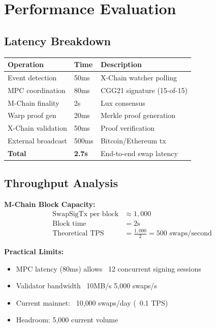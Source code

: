 \documentclass[11pt]{article}
\begin{document}
\section{Performance Evaluation}

\subsection{Latency Breakdown}

\begin{table}[h]
\centering
\begin{tabular}{@{}lll@{}}
\toprule
\textbf{Operation} & \textbf{Time} & \textbf{Description} \\
\midrule
Event detection & 50ms & X-Chain watcher polling \\
MPC coordination & 80ms & CGG21 signature (15-of-15) \\
M-Chain finality & 2s & Lux consensus \\
Warp proof gen & 20ms & Merkle proof generation \\
X-Chain validation & 50ms & Proof verification \\
External broadcast & 500ms & Bitcoin/Ethereum tx \\
\midrule
\textbf{Total} & \textbf{2.7s} & End-to-end swap latency \\
\bottomrule
\end{tabular}

\label{tab:latency}
\end{table}

\subsection{Throughput Analysis}

\textbf{M-Chain Block Capacity:}
\begin{align}
\text{SwapSigTx per block} &\approx 1{,}000 \\
\text{Block time} &= 2\text{s} \\
\text{Theoretical TPS} &= \frac{1{,}000}{2} = 500 \text{ swaps/second}
\end{align}

\textbf{Practical Limits:}
\begin{itemize}
\item MPC latency (80ms) allows ~12 concurrent signing sessions
\item Validator bandwidth ~10MB/s \rightarrow{} 5{,}000 swaps/s
\item Current mainnet: ~10{,}000 swaps/day (~0.1 TPS)
\item Headroom: 5{,}000\times{} current volume
\end{itemize}
\end{document}
